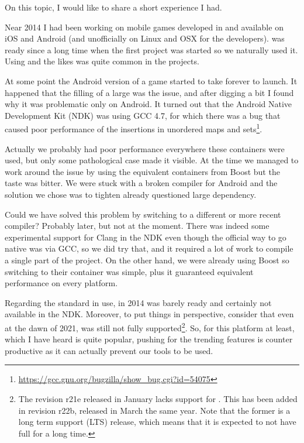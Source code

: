 On this topic, I would like to share a short experience I had.

\bigskip

Near 2014 I had been working on mobile games developed in \cpp{} and
available on iOS and Android (and unofficially on Linux and OSX for
the developers).  was ready since a long time when the first
project was started so we naturally used it. Using
 and the likes was quite common in the
projects.

At some point the Android version of a game started to take forever to
launch. It happened that the filling of a large
 was the issue, and after digging a bit I
found why it was problematic only on Android. It turned out that the
Android Native Development Kit (NDK) was using GCC 4.7, for which
there was a bug that caused poor performance of the insertions in
unordered maps and
sets\footnote{\url{https://gcc.gnu.org/bugzilla/show_bug.cgi?id=54075}}.

Actually we probably had poor performance everywhere these
containers were used, but only some pathological case made it
visible. At the time we managed to work around the issue by using the
equivalent containers from Boost but the taste was bitter. We were
stuck with a broken compiler for Android and the solution we chose was
to tighten already questioned large dependency.

\bigskip

Could we have solved this problem by switching to a different or more
recent compiler? Probably later, but not at the moment. There was
indeed some experimental support for Clang in the NDK even though the
official way to go native was via GCC, so we did try that, and it
required a lot of work to compile a single part of the project. On the
other hand, we were already using Boost so switching to their
container was simple, plus it guaranteed equivalent performance on
every platform.

Regarding the standard in use, in 2014  was barely ready and
certainly not available in the NDK. Moreover, to put things in
perspective, consider that even at the dawn of 2021,  was still
not fully supported\footnote{The revision r21e released in January
  lacks support for . This has been added in
  revision r22b, released in March the same year. Note that the former
  is a long term support (LTS) release, which means that it is
  expected to not have full  for a long time.}. So, for this
platform at least, which I have heard is quite popular, pushing for
the trending features is counter productive as it can actually prevent
our tools to be used.

